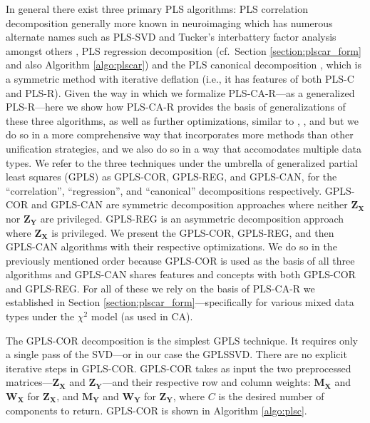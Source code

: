 \documentclass[12pt]{article}
\begin{document}
In general there exist three primary PLS algorithms: PLS correlation
decomposition \citep{bookstein1994partial, ketterlinus1989partial}
generally more known in neuroimaging
\citep{mcintosh_spatial_1996, mcintosh_partial_2004, krishnan_partial_2011}
which has numerous alternate names such as PLS-SVD and Tucker's
interbattery factor analysis \citep{tucker_inter-battery_1958} amongst
others \citep[see also][]{beaton_partial_2016}, PLS regression
decomposition (cf.~Section \ref{section:plscar_form} and also Algorithm
\ref{algo:plscar}) and the PLS canonical decomposition
\citep{tenenhaus_regression_1998, wegelin2000survey}, which is a
symmetric method with iterative deflation (i.e., it has features of both
PLS-C and PLS-R). Given the way in which we formalize PLS-CA-R---as a
generalized PLS-R---here we show how PLS-CA-R provides the basis of
generalizations of these three algorithms, as well as further
optimizations, similar to \citet{borga_unified_1992},
\citet{indahl2009canonical}, and \citet{de2019pls} but we do so in a
more comprehensive way that incorporates more methods than other
unification strategies, and we also do so in a way that accomodates
multiple data types. We refer to the three techniques under the umbrella
of generalized partial least squares (GPLS) as GPLS-COR, GPLS-REG, and
GPLS-CAN, for the ``correlation'', ``regression'', and ``canonical''
decompositions respectively. GPLS-COR and GPLS-CAN are symmetric
decomposition approaches where neither \({\mathbf Z}_{{\mathbf X}}\) nor
\({\mathbf Z}_{{\mathbf Y}}\) are privileged. GPLS-REG is an asymmetric
decomposition approach where \({\mathbf Z}_{{\mathbf X}}\) is
privileged. We present the GPLS-COR, GPLS-REG, and then GPLS-CAN
algorithms with their respective optimizations. We do so in the
previously mentioned order because GPLS-COR is used as the basis of all
three algorithms and GPLS-CAN shares features and concepts with both
GPLS-COR and GPLS-REG. For all of these we rely on the basis of PLS-CA-R
we established in Section \ref{section:plscar_form}---specifically for
various mixed data types under the \(\chi^2\) model (as used in CA).

The GPLS-COR decomposition is the simplest GPLS technique. It requires
only a single pass of the SVD---or in our case the GPLSSVD. There are no
explicit iterative steps in GPLS-COR. GPLS-COR takes as input the two
preprocessed matrices---\({\mathbf Z}_{\mathbf X}\) and
\({\mathbf Z}_{\mathbf Y}\)---and their respective row and column
weights: \({\mathbf M}_{\mathbf X}\) and \({\mathbf W}_{\mathbf X}\) for
\({\mathbf Z}_{\mathbf X}\), and \({\mathbf M}_{\mathbf Y}\) and
\({\mathbf W}_{\mathbf Y}\) for \({\mathbf Z}_{\mathbf Y}\), where \(C\)
is the desired number of components to return. GPLS-COR is shown in
Algorithm \ref{algo:plsc}.
\end{document}
